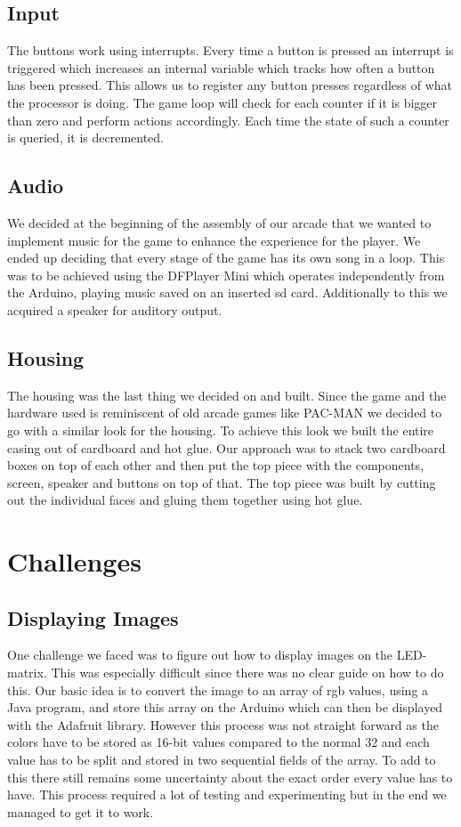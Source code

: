 \documentclass[10pt, a4paper]{article}
\begin{document}
\subsection*{Input}
The buttons work using interrupts. Every time a button is pressed an interrupt is triggered which increases an internal variable which tracks how often a button has been pressed. This allows us to register any button presses regardless of what the processor is doing. The game loop will check for each counter if it is bigger than zero and perform actions accordingly. Each time the state of such a counter is queried, it is decremented.

\subsection*{Audio}
We decided at the beginning of the assembly of our arcade that we wanted to implement music for the game to enhance the experience for the player. We ended up deciding that every stage of the game has its own song in a loop. This was to be achieved using the DFPlayer Mini which operates independently from the Arduino, playing music saved on an inserted sd card. Additionally to this we acquired a speaker for auditory output.

\subsection*{Housing}
The housing was the last thing we decided on and built. Since the game and the hardware used is reminiscent of old arcade games like PAC-MAN we decided to go with a similar look for the housing. To achieve this look we built the entire casing out of cardboard and hot glue. Our approach was to stack two cardboard boxes on top of each other and then put the top piece with the components, screen, speaker and buttons on top of that. The top piece was built by cutting out the individual faces and gluing them together using hot glue.


\section*{Challenges}
\label{sec:challenges}

\subsection*{Displaying Images}
One challenge we faced was to figure out how to display images on the LED-matrix. This was especially difficult since there was no clear guide on how to do this. Our basic idea is to convert the image to an array of rgb values, using a Java program, and store this array on the Arduino which can then be displayed with the Adafruit library. However this process was not straight forward as the colors have to be stored as 16-bit values compared to the normal 32 and each value has to be split and stored in two sequential fields of the array. To add to this there still remains some uncertainty about the exact order every value has to have. This process required a lot of testing and experimenting but in the end we managed to get it to work. 
\end{document}
